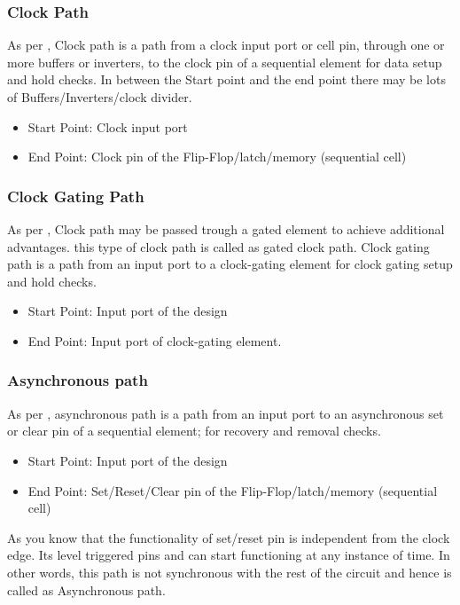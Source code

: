 \subsubsection{Clock Path}
As per , Clock path is a path from a clock input port or cell pin, through one or more buffers or inverters, to the clock pin of a sequential element for data setup and hold checks. In between the Start point and the end point there may be lots of Buffers/Inverters/clock divider.

\begin{itemize}
    \item Start Point: Clock input port
    \item End Point: Clock pin of the Flip-Flop/latch/memory (sequential cell)
\end{itemize}

\subsubsection{Clock Gating Path}
As per , Clock path may be passed trough a gated element to achieve additional advantages. this type of clock path is called as gated clock path. Clock gating path is a path from an input port to a clock-gating element for clock gating setup and hold checks.

\begin{itemize}
    \item Start Point: Input port of the design
    \item End Point: Input port of clock-gating element.
\end{itemize}

\subsubsection{Asynchronous path}
As per , asynchronous path is a path from an input port to an asynchronous set or clear pin of a sequential element; for recovery and removal checks.

\begin{itemize}
    \item Start Point: Input port of the design
    \item End Point: Set/Reset/Clear pin of the Flip-Flop/latch/memory (sequential cell)
\end{itemize}

As you know that the functionality of set/reset pin is independent from the clock edge. Its level triggered pins and can start functioning at any instance of time. In other words, this path is not synchronous with the rest of the circuit and hence is called as Asynchronous path.

